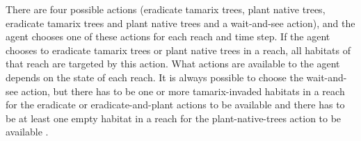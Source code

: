 There are four possible actions (eradicate tamarix trees, plant native trees,
eradicate tamarix trees and plant native trees and a wait-and-see action),
and the agent chooses one of these actions for each reach and time step. If the 
agent chooses to eradicate tamarix trees or plant native trees in a reach, 
all habitats of that reach are targeted by this action. What
actions are available to the agent depends on the state of each reach. It is
always possible to choose the wait-and-see action, but there has to be one
or more tamarix-invaded habitats in a reach for the eradicate or eradicate-and-plant actions to be available and there has to be at least one empty habitat in
a reach for the plant-native-trees action to be available
\parencite{invasiveSpecis2014:Online}.  
